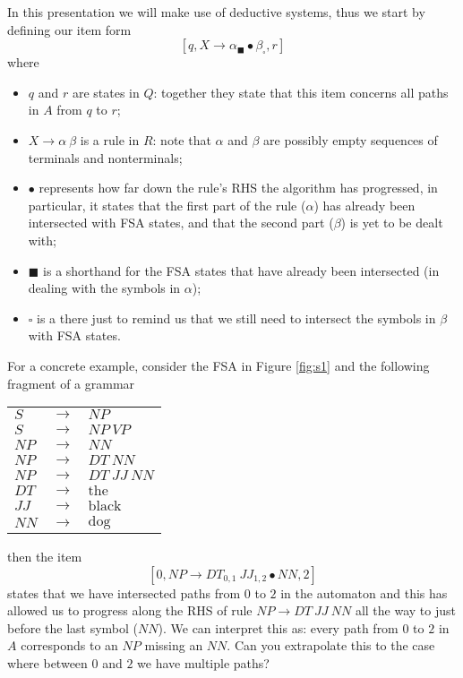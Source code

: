 \documentclass[11pt]{article}
\newcommand{\itembrack}[1]{\ensuremath{\left[ #1 \right]}}
\begin{document}
In this presentation we will make use of deductive systems, thus we start by defining our item form
\begin{equation}
\itembrack{q, X \rightarrow \alpha_\blacksquare \bullet \beta_\square, r}
\end{equation}
where
\begin{itemize}
	\item $q$ and $r$ are states in $Q$: together they state that this item concerns all paths in $A$ from $q$ to $r$; 
	\item $X \rightarrow \alpha ~ \beta$ is a rule in $R$: note that $\alpha$ and $\beta$ are possibly empty sequences of terminals and nonterminals;
	\item $\bullet$ represents how far down the rule's RHS the algorithm has progressed, in particular, it states that the first part of the rule ($\alpha$) has already been intersected with FSA states, and that the second part ($\beta$) is yet to be dealt with;
	\item $\blacksquare$ is a shorthand for the FSA states that have already been intersected (in dealing with the symbols in $\alpha$);
	\item $\square$ is a there just to remind us that we still need to intersect the symbols in $\beta$ with FSA states.
\end{itemize}
For a concrete example, consider the FSA in Figure \ref{fig:s1} and the following fragment of a grammar
\begin{center}
\begin{tabular}{l l l}
$S$ & $\rightarrow$ & $NP$ \\
$S$ & $\rightarrow$ & $NP ~ VP$ \\
$NP$ & $\rightarrow$ & $NN$ \\
$NP$ & $\rightarrow$ & $DT ~ NN$ \\
$NP$ & $\rightarrow$ & $DT ~ JJ ~ NN$ \\
$DT$ & $\rightarrow$ & $\text{the}$ \\
$JJ$ & $\rightarrow$ & $\text{black}$ \\
$NN$ & $\rightarrow$ & $\text{dog}$ \\
\end{tabular}
\end{center}
then the item
$$\itembrack{0, NP \rightarrow DT_{0,1} ~ JJ_{1,2} \bullet NN, 2}$$
states that we have intersected paths from $0$ to $2$ in the automaton and this has allowed us to progress along the RHS of rule $NP \rightarrow DT ~ JJ ~ NN$ all the way to just before the last symbol ($NN$). We can interpret this as: every path from $0$ to $2$ in $A$ corresponds to an $NP$ missing an $NN$.
Can you extrapolate this to the case where between $0$ and $2$ we have multiple paths?
\end{document}
